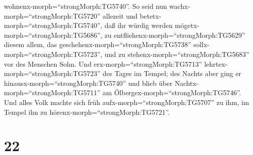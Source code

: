 wohnenx-morph=``strongMorph:TG5740''.  So seid nun
wachx-morph=``strongMorph:TG5720'' allezeit und
betetx-morph=``strongMorph:TG5740'', daß ihr würdig werden
mögetx-morph=``strongMorph:TG5686'', zu
entfliehenx-morph=``strongMorph:TG5629'' diesem allem, das
geschehenx-morph=``strongMorph:TG5738''
sollx-morph=``strongMorph:TG5723'', und zu
stehenx-morph=``strongMorph:TG5683'' vor des Menschen Sohn.
 Und erx-morph=``strongMorph:TG5713''
lehrtex-morph=``strongMorph:TG5723'' des Tages im Tempel; des Nachts
aber ging er hinausx-morph=``strongMorph:TG5740'' und blieb über
Nachtx-morph=``strongMorph:TG5711'' am
Ölbergex-morph=``strongMorph:TG5746''.  Und alles Volk
machte sich früh aufx-morph=``strongMorph:TG5707'' zu ihm, im Tempel ihn
zu hörenx-morph=``strongMorph:TG5721''.

\hypertarget{section-21}{%
\section{22}\label{section-21}}

